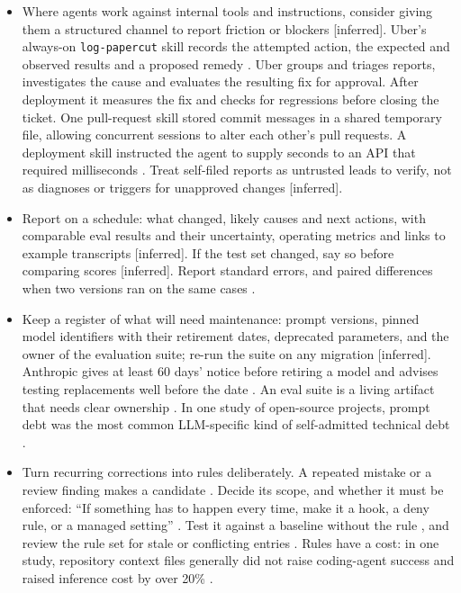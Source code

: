 \documentclass[10pt]{article}
\newcommand{\inferred}{\textsf{\small[inferred]}}
\begin{document}
\begin{itemize}
\item Where agents work against internal tools and instructions, consider giving them a structured channel to report friction or blockers \inferred. Uber's always-on \texttt{log-papercut} skill records the attempted action, the expected and observed results and a proposed remedy \cite[``Problem Discovery'']{uberskills}. Uber groups and triages reports, investigates the cause and evaluates the resulting fix for approval. After deployment it measures the fix and checks for regressions before closing the ticket. One pull-request skill stored commit messages in a shared temporary file, allowing concurrent sessions to alter each other's pull requests. A deployment skill instructed the agent to supply seconds to an API that required milliseconds \cite[``Problem Resolution'']{uberskills}. Treat self-filed reports as untrusted leads to verify, not as diagnoses or triggers for unapproved changes \inferred.
\item Report on a schedule: what changed, likely causes and next actions, with comparable eval results and their uncertainty, operating metrics and links to example transcripts \inferred. If the test set changed, say so before comparing scores \inferred. Report standard errors, and paired differences when two versions ran on the same cases \cite[Recommendations~1, 4]{anthstats}.
\item Keep a register of what will need maintenance: prompt versions, pinned model identifiers with their retirement dates, deprecated parameters, and the owner of the evaluation suite; re-run the suite on any migration \inferred. Anthropic gives at least 60 days' notice before retiring a model and advises testing replacements well before the date \cite[intro]{claudedeprec}. An eval suite is a living artifact that needs clear ownership \cite[step~8]{anthevals}. In one study of open-source projects, prompt debt was the most common LLM-specific kind of self-admitted technical debt \cite[RQ2, Table~3]{promptdebt}.
\item Turn recurring corrections into rules deliberately. A repeated mistake or a review finding makes a candidate \cite[``When to add to CLAUDE.md'']{ccmemory}. Decide its scope, and whether it must be enforced: ``If something has to happen every time, make it a hook, a deny rule, or a managed setting'' \cite[``Enforce the rules that can't have exceptions'']{ccbest}. Test it against a baseline without the rule \cite[``Build evaluations first'']{skillsbp}, and review the rule set for stale or conflicting entries \cite[``Audit your instruction files'']{ccmemory}. Rules have a cost: in one study, repository context files generally did not raise coding-agent success and raised inference cost by over 20\% \cite[Abstract; \S4.2]{gloaguen}.

\end{itemize}
\end{document}
